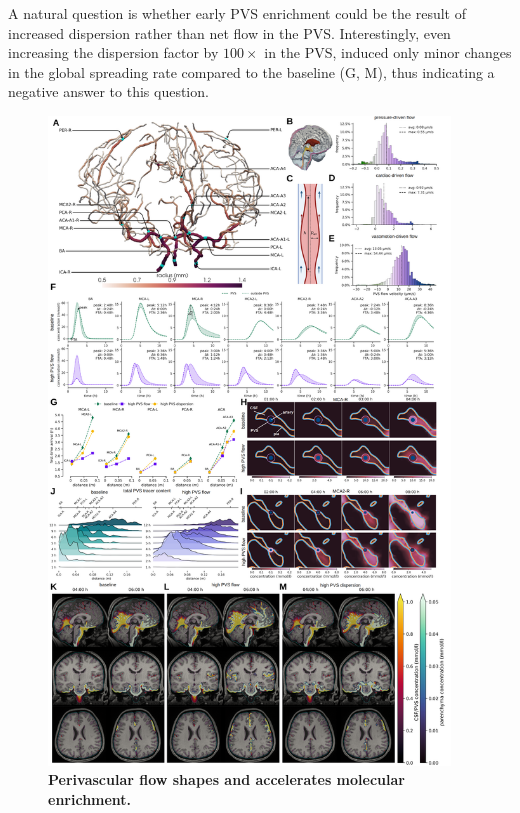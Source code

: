 \documentclass[fleqn,10pt]{wlscirep}
\begin{document}
A natural question is whether early PVS enrichment could be the result
of increased dispersion rather than net flow in the
PVS\cite{asgari2016glymphatic,sharp2019dispersion,bojarskaite2023sleep,asgari2016glymphatic,troyetsky2021dispersion}. Interestingly,
even increasing the dispersion factor by $100 \times$ in the PVS,
induced only minor changes in the global spreading rate compared to the
baseline (G, M), thus indicating a negative answer to
this question.
\begin{figure}
    \centering
    \includegraphics[width=0.95\textwidth]{figures/figure3.png}
    \caption{\textbf{Perivascular flow shapes and accelerates molecular enrichment.}}
    \label{fig:pvs}
\end{figure}
\end{document}
